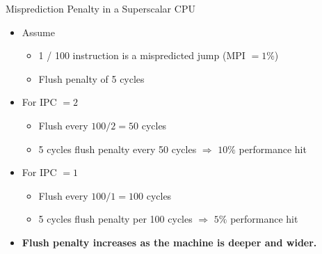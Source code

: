 \documentclass[aspectratio=169]{beamer}
\begin{document}
\begin{frame}{Misprediction Penalty in a Superscalar CPU}
\begin{itemize}
  \item Assume
  \begin{itemize}
    \item 1 / 100 instruction is a mispredicted jump (MPI $=1\%$)
    \item Flush penalty of 5 cycles
  \end{itemize}
  \item For IPC $=2$
  \begin{itemize}
    \item Flush every $100/2 = 50$ cycles
    \item 5 cycles flush penalty every 50 cycles $\Rightarrow$ $10\%$ performance hit
  \end{itemize}
  \item For IPC $=1$
  \begin{itemize}
    \item Flush every $100/1 = 100$ cycles
    \item 5 cycles flush penalty per 100 cycles $\Rightarrow$ $5\%$ performance hit
  \end{itemize}
  \item \textbf{Flush penalty increases as the machine is deeper and wider.}
\end{itemize}
\end{frame}
\end{document}
